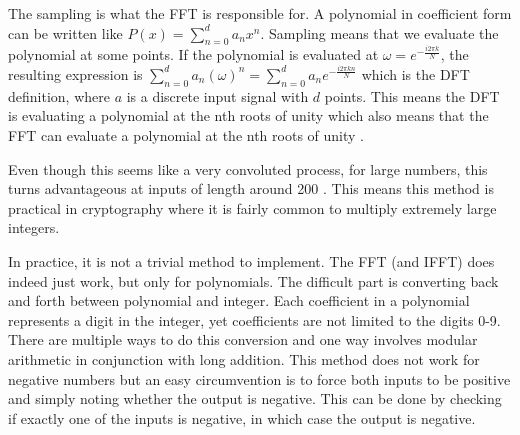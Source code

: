 The sampling is what the FFT is responsible for. A polynomial in coefficient form can be written like $P(x) = \sum^d_{n=0} a_nx^n$. Sampling means that we evaluate the polynomial at some points. If the polynomial is evaluated at $\omega = e^{-\frac{i2\pi k}{N}}$, the resulting expression is $\sum^d_{n=0} a_n(\omega)^n = \sum^d_{n=0} a_ne^{-\frac{i2\pi k n}{N}}$ which is the DFT definition, where $a$ is a discrete input signal with $d$ points. This means the DFT is evaluating a polynomial at the nth roots of unity which also means that the FFT can evaluate a polynomial at the nth roots of unity \cite{Emerencia2007}.

Even though this seems like a very convoluted process, for large numbers, this turns advantageous at inputs of length around 200 \cite{Emerencia2007}. This means this method is practical in cryptography where it is fairly common to multiply extremely large integers. 

In practice, it is not a trivial method to implement. The FFT (and IFFT) does indeed just work, but only for polynomials. The difficult part is converting back and forth between polynomial and integer. Each coefficient in a polynomial represents a digit in the integer, yet coefficients are not limited to the digits 0-9. There are multiple ways to do this conversion and one way involves modular arithmetic in conjunction with long addition. This method does not work for negative numbers but an easy circumvention is to force both inputs to be positive and simply noting whether the output is negative. This can be done by checking if exactly one of the inputs is negative, in which case the output is negative.





